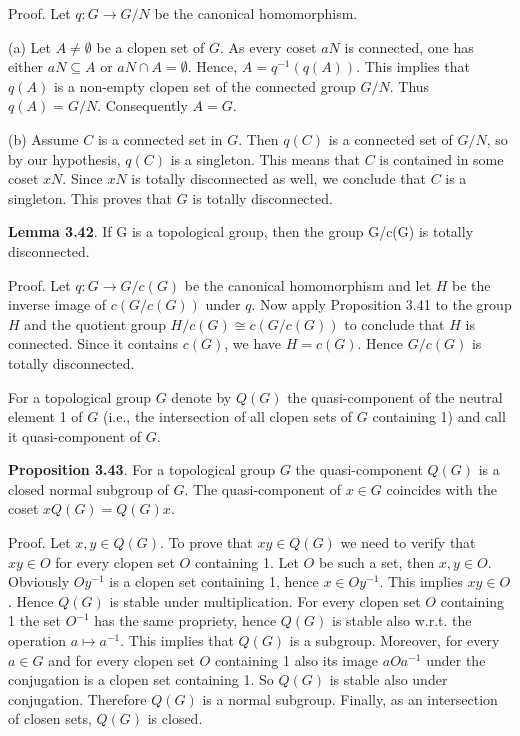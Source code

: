 \documentclass[12pt]{article}
\begin{document}
        Proof. Let $q : G \to G/N$ be the canonical homomorphism.


    (a) Let $A \neq \emptyset$ be a clopen set of $G$. As every coset $aN$ is connected, one has either $aN \subseteq A$ or $aN \cap A = \emptyset$.
    Hence, $A = q^{-1} (q(A))$. This implies that $q(A)$ is a non-empty clopen set of the connected group $G/N$. Thus
    $q(A) = G/N$. Consequently $A = G$.


    (b) Assume $C$ is a connected set in $G$. Then $q(C)$ is a connected set of $G/N$, so by our hypothesis, $q(C)$
    is a singleton. This means that $C$ is contained in some coset $xN$. Since $xN$ is totally disconnected as well, we
    conclude that $C$ is a singleton. This proves that $G$ is totally disconnected.


    \textbf{Lemma 3.42}. If G is a topological group, then the group G/c(G) is totally disconnected.


        Proof. Let $q : G \to G/c(G)$ be the canonical homomorphism and let $H$ be the inverse image of $c(G/c(G))$ under
    $q$. Now apply Proposition 3.41 to the group $H$ and the quotient group $H/c(G) \cong c(G/c(G))$ to conclude that
    $H$ is connected. Since it contains $c(G)$, we have $H = c(G)$. Hence $G/c(G)$ is totally disconnected.
    
    
    For a topological group $G$ denote by $Q(G)$ the quasi-component of the neutral element 1 of $G$ (i.e., the
    intersection of all clopen sets of $G$ containing 1) and call it quasi-component of $G$.


    \textbf{Proposition 3.43}.  For a topological group $G$ the quasi-component $Q(G)$ is a closed normal subgroup of $G$. The
    quasi-component of $x \in G$ coincides with the coset $xQ(G) = Q(G)x$.
    

    Proof. Let $x, y \in Q(G)$. To prove that $xy \in Q(G)$ we need to verify that $xy \in O$ for every clopen set $O$
    containing 1. Let $O$ be such a set, then $x, y \in O$. Obviously $Oy^{-1}$ is a clopen set containing 1, hence $x \in Oy^{-1}$.
    This implies $xy \in O$. Hence $Q(G)$ is stable under multiplication. For every clopen set $O$ containing 1 the set
    $O^{-1}$ has the same propriety, hence $Q(G)$ is stable also w.r.t. the operation $a \mapsto a^{-1}$. This implies that $Q(G)$ is
    a subgroup. Moreover, for every $a \in G$ and for every clopen set $O$ containing 1 also its image $aOa^{-1}$ under the
    conjugation is a clopen set containing 1. So $Q(G)$ is stable also under conjugation. Therefore $Q(G)$ is a normal
    subgroup. Finally, as an intersection of closen sets, $Q(G)$ is closed.
\end{document}
